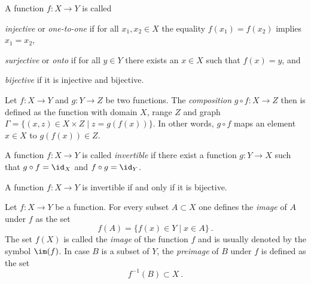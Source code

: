 \begin{definition}
  A function $f: X \to Y$ is called 
  \begin{letterlist}
  \item \emph{injective} or \emph{one-to-one} if for all $x_1,x_2 \in X$ the equality $f(x_1)= f(x_2)$ implies $x_1 = x_2$,
  \item \emph{surjective} or \emph{onto} if for all $y\in Y$ there exists an $x\in X$ such that $f(x)= y$, and
   \item \emph{bijective} if it is injective and bijective. 
  \end{letterlist}
\end{definition}

\begin{definition}
  Let $f : X \to Y$ and $g: Y \to Z$ be two functions. The \emph{composition} $g \circ f : X \to Z$  then is defined 
  as the function with domain $X$, range $Z$ and graph $\Gamma = \{ (x,z) \in X \times Z \mid z = g(f(x)) \} $.
  In other words, $g\circ f$ maps an element $x\in X$ to $g(f(x))\in Z$. 
\end{definition}

\begin{definition}
  A function  $f : X \to Y$ is called \emph{invertible} if there exist a function $g: Y \to X$ such that 
  $g \circ f = \id_X$ and  $f \circ g = \id_Y$.
\end{definition}

\begin{theorem}
  A function  $f : X \to Y$ is invertible if and only if it is bijective. 
\end{theorem}

\begin{definition} 
  Let $f: X \to Y$ be a function. For every subset $A \subset X$ 
  one defines the \emph{image} of $A$ under $f$ as the set 
  \[
    f(A) = \{ f(x) \in Y\mid x \in A \} \ .
  \]  
  The set $f(X)$ is called the \emph{image} of the function $f$
  and is usually denoted by the symbol $\im (f)$.
  In case $B$ is a subset of $Y$, the \emph{preimage} of $B$ under $f$ 
  is defined as  the set  
  \[
      f^{-1} (B) \subset X \ .
  \]
\end{definition}
 
